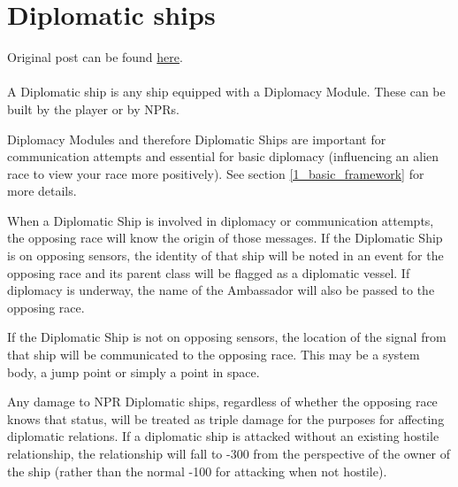 \documentclass[../../Aurora C# unofficial manual.tex]{subfiles}
\begin{document}
	\section{Diplomatic ships}\label{8_diplomatic_ships}
	Original post can be found
	\href{http://aurora2.pentarch.org/index.php?topic=8495.msg120024#msg120024}{here}.
	\\\\
	
	A Diplomatic ship is any ship equipped with a Diplomacy Module. These can be built by the player or by NPRs.
	
	Diplomacy Modules and therefore Diplomatic Ships are important for communication attempts and essential for basic diplomacy (influencing an alien race to view your race more positively). See section \ref{1_basic_framework} for more details.
	
	When a Diplomatic Ship is involved in diplomacy or communication attempts, the opposing race will know the origin of those messages. If the Diplomatic Ship is on opposing sensors, the identity of that ship will be noted in an event for the opposing race and its parent class will be flagged as a diplomatic vessel. If diplomacy is underway, the name of the Ambassador will also be passed to the opposing race.
	
	If the Diplomatic Ship is not on opposing sensors, the location of the signal from that ship will be communicated to the opposing race. This may be a system body, a jump point or simply a point in space.
	
	Any damage to NPR Diplomatic ships, regardless of whether the opposing race knows that status, will be treated as triple damage for the purposes for affecting diplomatic relations. If a diplomatic ship is attacked without an existing hostile relationship, the relationship will fall to -300 from the perspective of the owner of the ship (rather than the normal -100 for attacking when not hostile).
\end{document}
